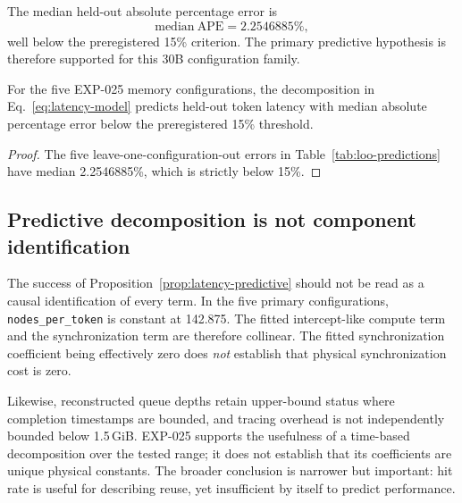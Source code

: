 The median held-out absolute percentage error is
\begin{equation}
    \mathrm{median\ APE}
    =
    2.2546885\%,
    \label{eq:median-ape}
\end{equation}
well below the preregistered 15\% criterion. The primary predictive hypothesis is therefore supported for this 30B configuration family.

\begin{proposition}
\label{prop:latency-predictive}
For the five EXP-025 memory configurations, the decomposition in Eq.~\eqref{eq:latency-model} predicts held-out token latency with median absolute percentage error below the preregistered 15\% threshold.
\end{proposition}

\begin{proof}
The five leave-one-configuration-out errors in Table~\ref{tab:loo-predictions} have median 2.2546885\%, which is strictly below 15\%.
\end{proof}

\subsection{Predictive decomposition is not component identification}

The success of Proposition~\ref{prop:latency-predictive} should not be read as a causal identification of every term. In the five primary configurations, \texttt{nodes\_per\_token} is constant at 142.875. The fitted intercept-like compute term and the synchronization term are therefore collinear. The fitted synchronization coefficient being effectively zero does \emph{not} establish that physical synchronization cost is zero.

Likewise, reconstructed queue depths retain upper-bound status where completion timestamps are bounded, and tracing overhead is not independently bounded below 1.5\,GiB. EXP-025 supports the usefulness of a time-based decomposition over the tested range; it does not establish that its coefficients are unique physical constants. The broader conclusion is narrower but important: hit rate is useful for describing reuse, yet insufficient by itself to predict performance.
